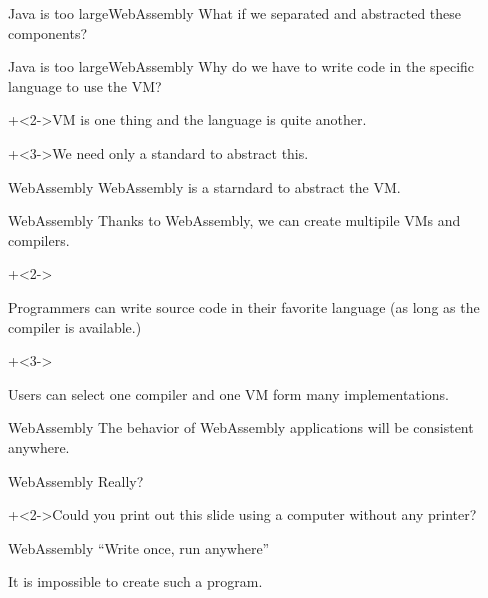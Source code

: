 \begin{frame}{Java is too large}{WebAssembly}
    What if we separated and abstracted these components?
\end{frame}


\begin{frame}{Java is too large}{WebAssembly}
    Why do we have to write code in the specific language to use the VM?
    \vspace{4ex}

    \onslide+<2->{VM is one thing and the language is quite another.}
    \vspace{4ex}

    \onslide+<3->{We need only a standard to abstract this.}
\end{frame}


\begin{frame}{WebAssembly}{}
    {\Large WebAssembly is a starndard to abstract the VM.}
\end{frame}


\begin{frame}{WebAssembly}{}
    Thanks to WebAssembly, we can create multipile VMs and compilers.
    \vspace{4ex}

    \begin{itemize}
        \onslide+<2->{\item Programmers can write source code in their favorite language (as long as the compiler is available.)}
        \onslide+<3->{\item Users can select one compiler and one VM form many implementations.}
    \end{itemize}
\end{frame}


\begin{frame}{WebAssembly}{}
    The behavior of WebAssembly applications will be consistent anywhere.
\end{frame}


\begin{frame}{WebAssembly}{}
    {\Huge Really?}
    \vspace{4ex}

    \onslide+<2->{Could you print out this slide using a computer without any printer?}
\end{frame}


\begin{frame}{WebAssembly}{}
    ``Write once, run anywhere''
    \vspace{4ex}

    It is impossible to create such a program.
\end{frame}


